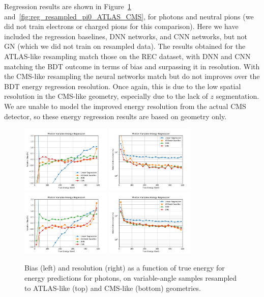Regression results are shown in Figure~\ref{fig:reg_resampled_gamma_ATLAS_CMS} and~\ref{fig:reg_resampled_pi0_ATLAS_CMS}, for photons and neutral pions (we did not train electrons or charged pions for this comparison). Here we have included the regression baselines, DNN networks, and CNN networks, but not GN (which we did not train on resampled data). The results obtained for the ATLAS-like resampling match those on the REC dataset, with DNN and CNN matching the BDT outcome in terms of bias and surpassing it in resolution. With the CMS-like resampling the neural networks match but do not improves over the BDT energy regression resolution. Once again, this is due to the low spatial resolution in the CMS-like geometry, especially due to the lack of $z$ segmentation. We are unable to model the improved energy resolution from the actual CMS detector, so these energy regression results are based on geometry only.

\begin{figure}[htbp]
\centering
\includegraphics[width=0.38\textwidth]{Images/Calo/bias_vs_E_Gamma_variable_ATLAS.pdf}
\includegraphics[width=0.38\textwidth]{Images/Calo/res_vs_E_Gamma_variable_ATLAS.pdf} \\
\includegraphics[width=0.38\textwidth]{Images/Calo/bias_vs_E_Gamma_variable_CMS.pdf}
\includegraphics[width=0.38\textwidth]{Images/Calo/res_vs_E_Gamma_variable_CMS.pdf}
\caption{Bias (left) and resolution (right) as a function of true energy for energy predictions for photons, on variable-angle samples resampled to ATLAS-like (top) and CMS-like (bottom) geometries. \label{fig:reg_resampled_gamma_ATLAS_CMS}}
\end{figure}

